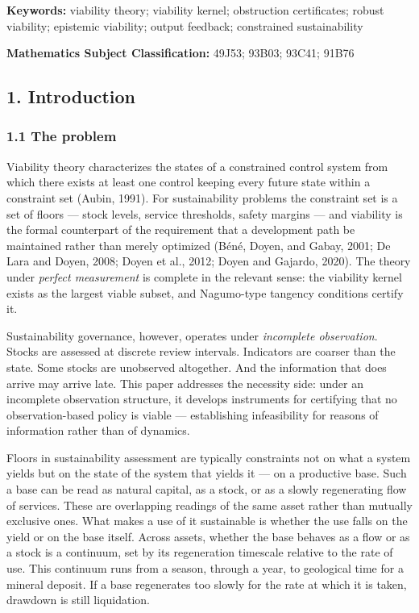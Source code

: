 \documentclass[11pt]{article}
\begin{document}
\textbf{Keywords:} viability theory; viability kernel; obstruction
certificates; robust viability; epistemic viability; output feedback;
constrained sustainability

\textbf{Mathematics Subject Classification:} 49J53; 93B03; 93C41; 91B76

\subsection{1. Introduction}\label{introduction}

\subsubsection{1.1 The problem}\label{the-problem}

Viability theory characterizes the states of a constrained control
system from which there exists at least one control keeping every future
state within a constraint set (Aubin, 1991). For sustainability problems
the constraint set is a set of floors --- stock levels, service
thresholds, safety margins --- and viability is the formal counterpart
of the requirement that a development path be maintained rather than
merely optimized (B\'en\'e, Doyen, and Gabay, 2001; De Lara and Doyen, 2008;
Doyen et al., 2012; Doyen and Gajardo, 2020). The theory under
\emph{perfect measurement} is complete in the relevant sense: the
viability kernel exists as the largest viable subset, and Nagumo-type
tangency conditions certify it.

Sustainability governance, however, operates under \emph{incomplete
observation}. Stocks are assessed at discrete review intervals.
Indicators are coarser than the state. Some stocks are unobserved
altogether. And the information that does arrive may arrive late. This
paper addresses the necessity side: under an incomplete observation
structure, it develops instruments for certifying that no
observation-based policy is viable --- establishing infeasibility for
reasons of information rather than of dynamics.

Floors in sustainability assessment are typically constraints not on
what a system yields but on the state of the system that yields it ---
on a productive base. Such a base can be read as natural capital, as a
stock, or as a slowly regenerating flow of services. These are
overlapping readings of the same asset rather than mutually exclusive
ones. What makes a use of it sustainable is whether the use falls on the
yield or on the base itself. Across assets, whether the base behaves as
a flow or as a stock is a continuum, set by its regeneration timescale
relative to the rate of use. This continuum runs from a season, through
a year, to geological time for a mineral deposit. If a base regenerates
too slowly for the rate at which it is taken, drawdown is still
liquidation.
\end{document}
